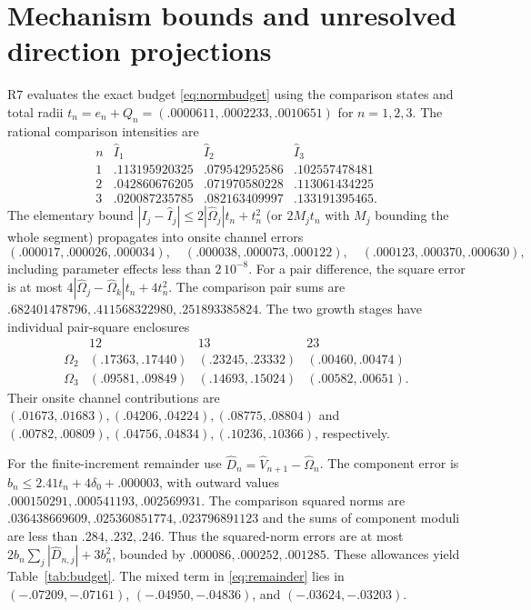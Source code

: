 \documentclass[11pt,a4paper]{article}
\numberwithin{equation}{section}
\begin{document}
\section{Mechanism bounds and unresolved direction projections}\label{app:mechanism}
R7 evaluates the exact budget \eqref{eq:normbudget} using the comparison
states and total radii
$t_n=e_n+Q_n=(.0000611,.0002233,.0010651)$ for $n=1,2,3$.
The rational comparison intensities are
\[
\begin{array}{c|ccc}
n&\widehat I_1&\widehat I_2&\widehat I_3\\ \hline
1&.113195920325&.079542952586&.102557478481\\
2&.042860676205&.071970580228&.113061434225\\
3&.020087235785&.082163409997&.133191395465 .
\end{array}
\]
The elementary bound $|I_j-\widehat I_j|\leq
2|\widehat\Omega_j|t_n+t_n^2$ (or $2M_jt_n$ with $M_j$ bounding the
whole segment) propagates into onsite channel errors
\[
(.000017,.000026,.000034),\quad
(.000038,.000073,.000122),\quad
(.000123,.000370,.000630),
\]
including parameter effects less than $2\,10^{-8}$. For a pair difference,
the square error is at most
$4|\widehat\Omega_j-\widehat\Omega_k|t_n+4t_n^2$.
The comparison pair sums are
$.682401478796,.411568322980,.251893385824$.
The two growth stages have individual pair-square enclosures
\[
\begin{array}{c|ccc}
&12&13&23\\ \hline
\Omega_2&(.17363,.17440)&(.23245,.23332)&(.00460,.00474)\\
\Omega_3&(.09581,.09849)&(.14693,.15024)&(.00582,.00651).
\end{array}
\]
Their onsite channel contributions are
$(.01673,.01683),(.04206,.04224),(.08775,.08804)$ and
$(.00782,.00809),(.04756,.04834),(.10236,.10366)$, respectively.

For the finite-increment remainder use
$\widehat D_n=\widehat V_{n+1}-\widehat\Omega_n$.
The component error is
$b_n\leq2.41t_n+4\delta_0+.000003$, with outward values
$.000150291,.000541193,.002569931$.
The comparison squared norms are
$.036438669609,.025360851774,.023796891123$ and the sums of component
moduli are less than $.284,.232,.246$.
Thus the squared-norm errors are at most
$2b_n\sum_j|\widehat D_{n,j}|+3b_n^2$, bounded by
$.000086,.000252,.001285$. These allowances yield
Table~\ref{tab:budget}. The mixed term in \eqref{eq:remainder} lies in
$(-.07209,-.07161)$, $(-.04950,-.04836)$, and $(-.03624,-.03203)$.
\end{document}
